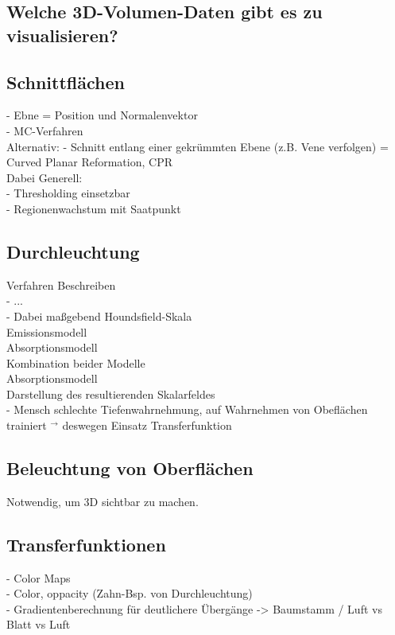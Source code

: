 \documentclass{article}
\begin{document}
\subsection{Welche 3D-Volumen-Daten gibt es zu visualisieren?}


\subsection{Schnittflächen}
- Ebne = Position und Normalenvektor\\
- MC-Verfahren\\

\noindent Alternativ: 
- Schnitt entlang einer gekrümmten Ebene (z.B. Vene verfolgen) = Curved Planar Reformation, CPR\\

\noindent Dabei Generell:\\
- Thresholding einsetzbar\\
- Regionenwachstum mit Saatpunkt


\subsection{Durchleuchtung}
Verfahren Beschreiben\\
- ...\\
- Dabei maßgebend Houndsfield-Skala\\

\noindent Emissionsmodell\\

\noindent Absorptionsmodell\\

\noindent Kombination beider Modelle\\

\noindent Absorptionsmodell\\

\noindent Darstellung des resultierenden Skalarfeldes\\
- Mensch schlechte Tiefenwahrnehmung, auf Wahrnehmen von Obeflächen trainiert $^\rightarrow$ deswegen Einsatz Transferfunktion

\subsection{Beleuchtung von Oberflächen}
Notwendig, um 3D sichtbar zu machen.\\

\subsection{Transferfunktionen}
- Color Maps\\
- Color, oppacity (Zahn-Bsp. von Durchleuchtung)\\
- Gradientenberechnung für deutlichere Übergänge -> Baumstamm / Luft vs Blatt vs Luft
\end{document}
